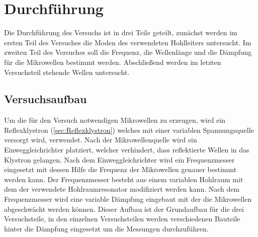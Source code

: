 \newpage
\section{Durchführung}
\label{sec:Durchfuehrung}
    Die Durchführung des Versuchs ist in drei Teile geteilt, zunächst werden im ersten Teil des Versuches die Moden des verwendeten Hohlleiters untersucht. Im zweiten Teil des Versuches soll die Frequenz, die Wellenlänge und die Dämpfung für die Mikrowellen bestimmt werden. Abschließend werden im letzten Versuchsteil stehende Wellen untersucht.
    \subsection{Versuchsaufbau}
        Um die für den Versuch notwendigen Mikrowellen zu erzeugen, wird ein Reflexklystron (\ref{sec:Reflexklystron}) welches mit einer variablen Spannungsquelle versorgt wird, verwendet.
        Nach der Mikrowellenquelle wird ein Einweggleichrichter platziert, welcher verhindert, dass reflektierte Wellen in das Klystron gelangen.
        Nach dem Einweggleichrichter wird ein Frequenzmesser eingesetzt mit dessen Hilfe die Frequenz der Mikrowellen genauer bestimmt werden kann.
        Der Frequenzmesser besteht aus einem variablen Hohlraum mit dem der verwendete Hohlraumresonator modifiziert werden kann.
        Nach dem Frequenzmesser wird eine variable Dämpfung eingebaut mit der die Mikrowellen abgeschwächt werden können.
        Dieser Aufbau ist der Grundaufbau für die drei Versuchsteile, in den einzelnen Versuchsteilen werden verschiedenen Bauteile hinter die Dämpfung eingesetzt um die Messungen durchzuführen.
